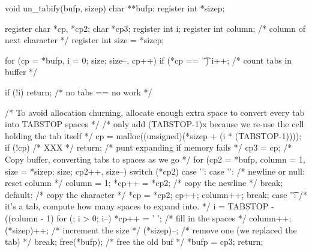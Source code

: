 \begin{code}
void
un_tabify(bufp, sizep)
char **bufp;
register int *sizep;
{
    register char *cp, *cp2;
    char *cp3;
    register int i;
    register int column;                /* column of next character */
    register int size = *sizep;

    for (cp = *bufp, i = 0; size; size--, cp++)
        if (*cp == '\t')
            i++;                        /* count tabs in buffer */

    if (!i)
        return;                         /* no tabs == no work */

    /* To avoid allocation churning, allocate enough extra space to convert
       every tab into TABSTOP spaces */
    /* only add (TABSTOP-1)x because we re-use the cell holding the
       tab itself */
    cp = malloc((unsigned)(*sizep + (i * (TABSTOP-1))));
    if (!cp)                            /* XXX */
        return;                         /* punt expanding if memory fails */
    cp3 = cp;
    /* Copy buffer, converting tabs to spaces as we go */
    for (cp2 = *bufp, column = 1, size = *sizep; size; cp2++, size--) {
        switch (*cp2) {
        case '\n':
        case '\0':
            /* newline or null: reset column */
            column = 1;
            *cp++ = *cp2;               /* copy the newline */
            break;
        default:
            /* copy the character */
            *cp = *cp2;
            cp++;
            column++;
            break;
        case '\t':
            /* it's a tab, compute how many spaces to expand into. */
            i = TABSTOP - ((column - 1) %
            for (; i > 0; i--) {
                *cp++ = ' ';            /* fill in the spaces */
                column++;
                (*sizep)++;             /* increment the size */
            }
            (*sizep)--;                 /* remove one (we replaced the tab) */
            break;
        }
    }
    free(*bufp);                        /* free the old buf */
    *bufp = cp3;
    return;
}
\end{code}
